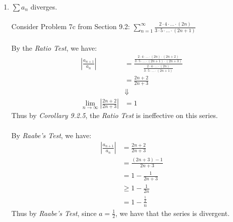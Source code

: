 \documentclass[12pt,letterpaper]{article}
\newcommand{\limx}[2]{\displaystyle\lim\limits_{#1 \to #2}}
\newcommand{\abs}[1]{\left\lvert #1 \right\rvert}
\theoremstyle{case}
\theoremstyle{definition}
\begin{document}
\begin{enumerate}
\begin{enumerate}
			\item $\sum a_n$ diverges.
			\\\\Consider Problem 7c from Section 9.2: $\displaystyle\sum_{n=1}^{\infty}\frac{2\cdot4\cdot\dots\cdot(2n)}{3\cdot5\cdot\dots\cdot(2n+1)}$
			\\\\By the \textit{Ratio Test}, we have:
			\begin{align*}
			\abs{\frac{a_{n+1}}{a_n}} &= \frac{\displaystyle\frac{2 \cdot 4 \cdot \dots \cdot (2n) \cdot (2n+2)}{3 \cdot 5 \cdot \dots \cdot (2n+1) \cdot (2n+3)}}{\displaystyle\frac{2 \cdot 4 \cdot \dots \cdot (2n)}{3 \cdot 5 \cdot \dots \cdot (2n+1)}} \\
			&= \frac{2n+2}{2n+3} \\
			&\Downarrow \\
			\limx{n}{\infty} \abs{\frac{2n+2}{2n+3}} &= 1
			\end{align*}
			Thus by \textit{Corollary 9.2.5}, the \textit{Ratio Test} is ineffective on this series.
			\\\\By \textit{Raabe's Test}, we have:
			\begin{align*}
			\abs{\frac{a_{n+1}}{a_n}} &= \frac{2n+2}{2n+3} \\
			&= \frac{(2n+3)-1}{2n+3} \\
			&= 1-\frac{1}{2n+3} \\
			&\geq 1-\frac{1}{2n} \\
			&= 1-\frac{\frac{1}{2}}{n}
			\end{align*}
			Thus by \textit{Raabe's Test}, since $a=\frac{1}{2}$, we have that the series is divergent.\\
			
		\end{enumerate}
	

\end{enumerate}
\end{document}
